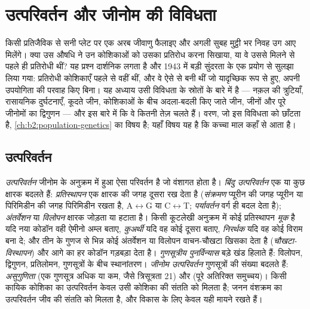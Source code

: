 \chapter{उत्परिवर्तन और जीनोम की विविधता}\label{ch:b2:genome-diversification}

किसी प्रतिजैविक से सनी प्लेट पर एक अरब जीवाणु फैलाइए और अगली सुबह
मुट्ठी भर निवह उग आए मिलेंगे। क्या उस औषधि ने उन कोशिकाओं को उसका
प्रतिरोध करना सिखाया, या वे उससे मिलने से पहले ही प्रतिरोधी थीं? यह
प्रश्न दार्शनिक लगता है और 1943 में बड़ी सुंदरता के एक प्रयोग से सुलझा
लिया गया: प्रतिरोधी कोशिकाएँ पहले से वहीं थीं, और वे ऐसे  से
बनी थीं जो यादृच्छिक रूप से हुए, अपनी उपयोगिता की परवाह किए बिना। यह
अध्याय उसी विविधता के स्रोतों के बारे में है --- नक़ल की त्रुटियाँ,
रासायनिक दुर्घटनाएँ, कूदते जीन, कोशिकाओं के बीच अदला-बदली किए जाते जीन,
जीनों और पूरे जीनोमों का द्विगुणन --- और इस बारे में कि वे कितनी तेज़
चलते हैं। वरण, जो इस विविधता को छाँटता है,
\cref{ch:b2:population-genetics} का विषय है; यहाँ विषय यह है कि कच्चा
माल कहाँ से आता है।

\section{उत्परिवर्तन}

\begin{definition}[उत्परिवर्तन और उसके प्रकार]\label{def:b2:genome-diversification:mutation}
\emph{उत्परिवर्तन} जीनोम के अनुक्रम में हुआ ऐसा परिवर्तन है जो
वंशागत होता है। \emph{बिंदु उत्परिवर्तन} एक या कुछ क्षारक बदलते हैं:
\emph{प्रतिस्थापन} एक क्षारक की जगह दूसरा रख देता है (\emph{संक्रमण}
प्यूरीन की जगह प्यूरीन या पिरिमिडीन की जगह पिरिमिडीन रखता है,
A$\leftrightarrow$G या C$\leftrightarrow$T; \emph{पर्यावर्तन} वर्ग ही
बदल देता है); \emph{अंतर्वेशन} या \emph{विलोपन} क्षारक जोड़ता या हटाता
है। किसी कूटलेखी अनुक्रम में कोई प्रतिस्थापन \emph{मूक} है यदि नया
कोडॉन वही ऐमीनो अम्ल बताए, \emph{कुअर्थी} यदि वह कोई दूसरा बताए,
\emph{निरर्थक} यदि वह कोई विराम बना दे; और तीन के गुणज से भिन्न कोई
अंतर्वेशन या विलोपन वाचन-चौखटा खिसका देता है (\emph{चौखटा-विस्थापन})
और आगे का हर कोडॉन गड़बड़ा देता है। \emph{गुणसूत्रीय पुनर्विन्यास} बड़े
खंड हिलाते हैं: विलोपन, द्विगुणन, प्रतिलोमन, गुणसूत्रों के बीच
स्थानांतरण। \emph{जीनोम उत्परिवर्तन} गुणसूत्रों की संख्या बदलते हैं:
\emph{असुगुणिता} (एक गुणसूत्र अधिक या कम, जैसे त्रिसूत्रता 21) और
\emph{} (पूरे अतिरिक्त समुच्चय)। किसी कायिक
कोशिका का उत्परिवर्तन केवल उसी कोशिका की संतति को मिलता है; जनन वंशक्रम
का उत्परिवर्तन जीव की संतति को मिलता है, और विकास के लिए केवल यही मायने
रखते हैं।
\end{definition}

